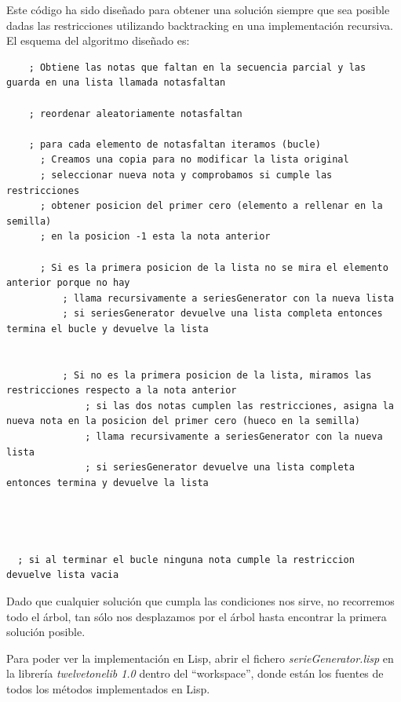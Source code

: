 \documentclass[a4paper,openany,oneside,12pt]{book}
\begin{document}
Este código ha sido diseñado para obtener una solución siempre que sea posible dadas las restricciones utilizando backtracking en una implementación recursiva. El esquema del algoritmo diseñado es:

   \lstset{language=Lisp,
           basicstyle=\ttfamily\scriptsize,
           keywordstyle=\ttfamily,
           stringstyle=\ttfamily,
           commentstyle=\ttfamily,
          breaklines=true
          }
\begin{lstlisting}
    ; Obtiene las notas que faltan en la secuencia parcial y las guarda en una lista llamada notasfaltan

    ; reordenar aleatoriamente notasfaltan

  	; para cada elemento de notasfaltan iteramos (bucle)
      ; Creamos una copia para no modificar la lista original
      ; seleccionar nueva nota y comprobamos si cumple las restricciones
      ; obtener posicion del primer cero (elemento a rellenar en la semilla)
      ; en la posicion -1 esta la nota anterior
      
      ; Si es la primera posicion de la lista no se mira el elemento anterior porque no hay
          ; llama recursivamente a seriesGenerator con la nueva lista
          ; si seriesGenerator devuelve una lista completa entonces termina el bucle y devuelve la lista


          ; Si no es la primera posicion de la lista, miramos las restricciones respecto a la nota anterior
              ; si las dos notas cumplen las restricciones, asigna la nueva nota en la posicion del primer cero (hueco en la semilla)
              ; llama recursivamente a seriesGenerator con la nueva lista
              ; si seriesGenerator devuelve una lista completa entonces termina y devuelve la lista




  ; si al terminar el bucle ninguna nota cumple la restriccion devuelve lista vacia

\end{lstlisting}

Dado que cualquier solución que cumpla las condiciones nos sirve, no recorremos todo el árbol, tan sólo nos desplazamos por el árbol hasta encontrar la primera solución posible.

Para poder ver la implementación en Lisp, abrir el fichero \emph{serieGenerator.lisp} en la librería \emph{twelvetonelib 1.0} dentro del ``workspace'', donde están los fuentes de todos los métodos implementados en Lisp.
\end{document}
